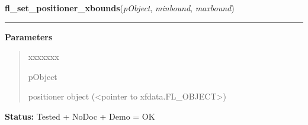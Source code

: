 \hspace{.8\funcindent}\begin{boxedminipage}{\funcwidth}

    \raggedright \textbf{fl\_set\_positioner\_xbounds}(\textit{pObject}, \textit{minbound}, \textit{maxbound})

    \vspace{-1.5ex}

    \rule{\textwidth}{0.5\fboxrule}
\setlength{\parskip}{2ex}
\setlength{\parskip}{1ex}
      \textbf{Parameters}
      \vspace{-1ex}

      \begin{quote}
        \begin{Ventry}{xxxxxxx}

          \item[pObject]

          positioner object ({\textless}pointer to 
          xfdata.FL\_OBJECT{\textgreater})

        \end{Ventry}

      \end{quote}

\textbf{Status:} Tested + NoDoc + Demo = OK



    \end{boxedminipage}

    \label{xformslib:library:fl_get_positioner_xbounds}

    \vspace{0.5ex}

